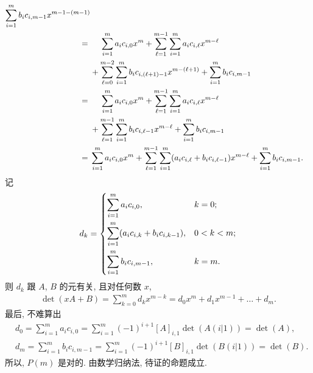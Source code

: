 \documentclass[../libro.tex]{subfiles}
\begin{document}
\begin{example}
\begin{align*}
        \sum_{i = 1}^{m}
        b_i c_{i,m-1} x^{m-1-(m-1)}
        \\
        = {} & \hphantom{{} + {}}
        \sum_{i = 1}^{m}
        a_i c_{i,0} x^{m}
        +
        \sum_{\ell = 1}^{m-1}
        \sum_{i = 1}^{m}
        a_i c_{i,\ell} x^{m-\ell}
        \\
        &
        +
        \sum_{\ell = 0}^{m-2}
        \sum_{i = 1}^{m}
        b_i c_{i,(\ell+1)-1} x^{m-(\ell+1)}
        +
        \sum_{i = 1}^{m}
        b_i c_{i,m-1}
        \\
        = {} & \hphantom{{} + {}}
        \sum_{i = 1}^{m}
        a_i c_{i,0} x^{m}
        +
        \sum_{\ell = 1}^{m-1}
        \sum_{i = 1}^{m}
        a_i c_{i,\ell} x^{m-\ell}
        \\
        &
        +
        \sum_{\ell = 1}^{m-1}
        \sum_{i = 1}^{m}
        b_i c_{i,\ell-1} x^{m-\ell}
        +
        \sum_{i = 1}^{m}
        b_i c_{i,m-1}
        \\
        = {} &
        \sum_{i = 1}^{m} a_i c_{i,0}
        x^{m}
        +
        \sum_{\ell = 1}^{m-1}
        \sum_{i = 1}^{m}
        (a_i c_{i,\ell} + b_i c_{i,\ell-1})
        x^{m-\ell}
        +
        \sum_{i = 1}^{m} b_i c_{i,m-1}.
    \end{align*}
    记
    \begin{align*}
        d_k =
        \begin{dcases}
            \sum_{i = 1}^{m} a_i c_{i,0},
            & k = 0;     \\
            \sum_{i = 1}^{m}
            (a_i c_{i,k} + b_i c_{i,k-1}),
            & 0 < k < m; \\
            \sum_{i = 1}^{m} b_i c_{i,m-1},
            & k = m.
        \end{dcases}
    \end{align*}
    则 \(d_k\) 跟 \(A\), \(B\) 的元有关,
    且对任何数 \(x\),
    \begin{align*}
        \det {(xA + B)}
        = \sum_{k = 0}^{m} {d_k x^{m-k}}
        = d_0 x^m + d_1 x^{m-1} + \dots + d_m.
    \end{align*}
    最后, 不难算出
    \begin{align*}
        &
        d_0
        =
        \sum_{i = 1}^{m}
        a_i c_{i,0}
        =
        \sum_{i = 1}^{m}
        (-1)^{i+1} [A]_{i,1} \det {(A(i|1))}
        =
        \det {(A)},
        \\
        &
        d_m
        =
        \sum_{i = 1}^{m}
        b_i c_{i,m-1}
        =
        \sum_{i = 1}^{m}
        (-1)^{i+1} [B]_{i,1} \det {(B(i|1))}
        =
        \det {(B)}.
    \end{align*}
    所以, \(P(m)\) 是对的.
    由数学归纳法, 待证的命题成立.
\end{example}
\end{document}
